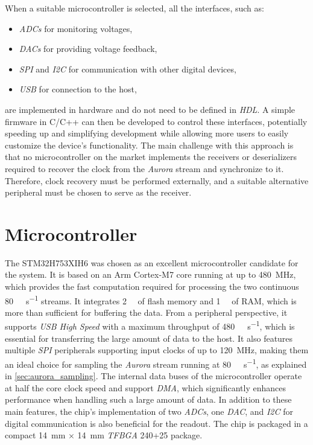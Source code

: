 When a suitable microcontroller is selected, all the interfaces, such as:
\begin{itemize}
    \item \emph{ADCs} for monitoring voltages,
    \item \emph{DACs} for providing voltage feedback,
    \item \emph{SPI} and \emph{I2C} for communication with other digital devices,
    \item \emph{USB} for connection to the host,
\end{itemize}
are implemented in hardware and do not need to be defined in \textit{HDL}. A simple firmware in C/C++ can then be developed to control these interfaces, potentially speeding up and simplifying development while allowing more users to easily customize the device's functionality. The main challenge with this approach is that no microcontroller on the market implements the receivers or deserializers required to recover the clock from the \emph{Aurora} stream and synchronize to it. Therefore, clock recovery must be performed externally, and a suitable alternative peripheral must be chosen to serve as the receiver.

\section{Microcontroller}
The STM32H753XIH6 was chosen as an excellent microcontroller candidate for the system. It is based on an Arm Cortex-M7 core running at up to \SI{480}{\mega\hertz}, which provides the fast computation required for processing the two continuous \SI{80}{\mega\bit\per\second} streams. It integrates \SI{2}{\mega\byte} of flash memory and \SI{1}{\mega\byte} of RAM, which is more than sufficient for buffering the data. From a peripheral perspective, it supports \emph{USB High Speed} with a maximum throughput of \SI{480}{\mega\bit\per\second}, which is essential for transferring the large amount of data to the host. It also features multiple \emph{SPI} peripherals supporting input clocks of up to \SI{120}{\mega\hertz}, making them an ideal choice for sampling the \emph{Aurora} stream running at \SI{80}{\mega\bit\per\second}, as explained in \ref{sec:aurora_sampling}. The internal data buses of the microcontroller operate at half the core clock speed and support \emph{DMA}, which significantly enhances performance when handling such a large amount of data. In addition to these main features, the chip's implementation of two \emph{ADCs}, one \emph{DAC}, and \emph{I2C} for digital communication is also beneficial for the readout. The chip is packaged in a compact \SI{14}{\milli\meter} $\times$ \SI{14}{\milli\meter} \emph{TFBGA} 240+25 package. \cite{stm32h753xih6_datasheet}

